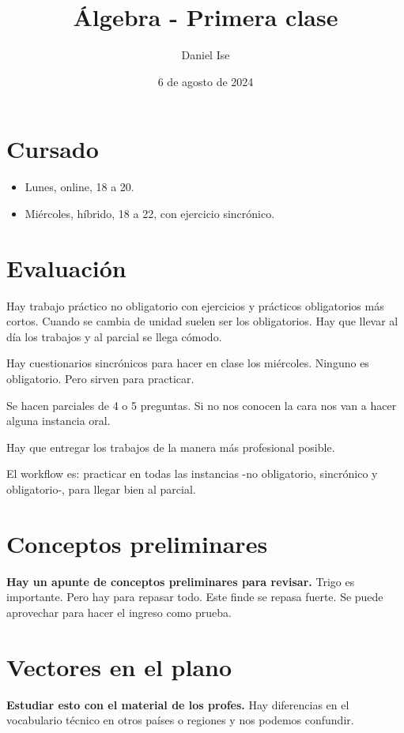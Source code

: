 \documentclass{article}
\title{Álgebra - Primera clase}
\author{Daniel Ise}
\date{6 de agosto de 2024}
\begin{document}
\maketitle

\section*{Cursado}

\begin{itemize}
    \item Lunes, online, 18 a 20.
    \item Miércoles, híbrido, 18 a 22, con ejercicio sincrónico.
\end{itemize}

\section*{Evaluación}

Hay trabajo práctico no obligatorio con ejercicios y prácticos obligatorios
más cortos. Cuando se cambia de unidad suelen ser los obligatorios. Hay que
llevar al día los trabajos y al parcial se llega cómodo.

Hay cuestionarios sincrónicos para hacer en clase los miércoles.
Ninguno es obligatorio. Pero sirven para practicar.

Se hacen parciales de 4 o 5 preguntas. Si no nos conocen la cara nos van a
hacer alguna instancia oral.

Hay que entregar los trabajos de la manera más profesional posible.

El workflow es: practicar en todas las instancias -no obligatorio, sincrónico y
obligatorio-, para llegar bien al parcial.

\section*{Conceptos preliminares}

\textbf{Hay un apunte de conceptos preliminares para revisar.} Trigo es
importante. Pero hay para repasar todo. Este finde se repasa fuerte. Se puede
aprovechar para hacer el ingreso como prueba.

\section*{Vectores en el plano}

\textbf{Estudiar esto con el material de los profes.} Hay diferencias
en el vocabulario técnico en otros países o regiones y nos podemos confundir.
\end{document}
